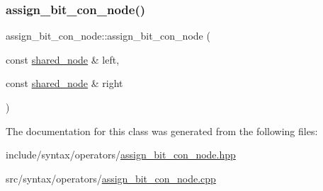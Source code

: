 \subsubsection{\texorpdfstring{assign\+\_\+bit\+\_\+con\+\_\+node()}{assign\_bit\_con\_node()}}
{\footnotesize\ttfamily assign\+\_\+bit\+\_\+con\+\_\+node\+::assign\+\_\+bit\+\_\+con\+\_\+node (\begin{DoxyParamCaption}\item[{const \hyperlink{namespacejawe_a3f307481d921b6cbb50cc8511fc2b544}{shared\+\_\+node} \&}]{left,  }\item[{const \hyperlink{namespacejawe_a3f307481d921b6cbb50cc8511fc2b544}{shared\+\_\+node} \&}]{right }\end{DoxyParamCaption})}



The documentation for this class was generated from the following files\+:\begin{DoxyCompactItemize}
\item 
include/syntax/operators/\hyperlink{assign__bit__con__node_8hpp}{assign\+\_\+bit\+\_\+con\+\_\+node.\+hpp}\item 
src/syntax/operators/\hyperlink{assign__bit__con__node_8cpp}{assign\+\_\+bit\+\_\+con\+\_\+node.\+cpp}\end{DoxyCompactItemize}
